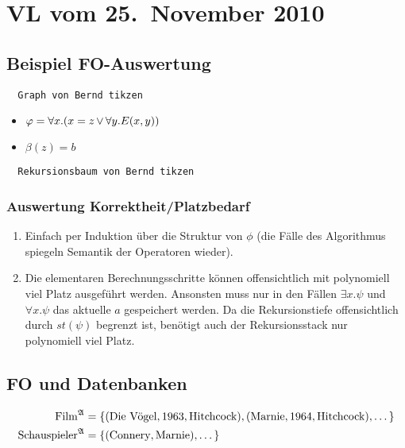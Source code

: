 \section{VL vom 25.~November 2010}

\subsection{Beispiel FO-Auswertung}

\begin{verbatim}
  Graph von Bernd tikzen
\end{verbatim}

\begin{itemize}
  \item $\varphi = \forall x.(x=z \operatorname{\vee} \forall y.E(x,y))$
  \item $\beta(z) = b$
\end{itemize}

\begin{verbatim}
  Rekursionsbaum von Bernd tikzen
\end{verbatim}

\subsubsection{Auswertung Korrektheit/Platzbedarf}

\begin{enumerate}
  \item Einfach per Induktion über die Struktur von $\phi$ (die Fälle
  des Algorithmus spiegeln Semantik der Operatoren wieder).
  
  \item Die elementaren Berechnungsschritte können offensichtlich mit
  polynomiell viel Platz ausgeführt werden. Ansonsten muss nur in den
  Fällen $\exists x.\psi$ und $\forall x.\psi$ das aktuelle $a$
  gespeichert werden. Da die Rekursionstiefe offensichtlich durch
  $st(\psi)$ begrenzt ist, benötigt auch der Rekursionsstack nur
  polynomiell viel Platz.
\end{enumerate}

\subsection{FO und Datenbanken}

\begin{align*}
  \text{Film}^{\mathfrak{A}} &= \left\{
                                  (\text{Die Vögel}, 1963, \text{Hitchcock}),
                                  (\text{Marnie}, 1964, \text{Hitchcock}),
                                  \dots
                                \right\} \\
  \text{Schauspieler}^{\mathfrak{A}} &= \left\{(\text{Connery}, \text{Marnie}), \dots\right\}
\end{align*}

